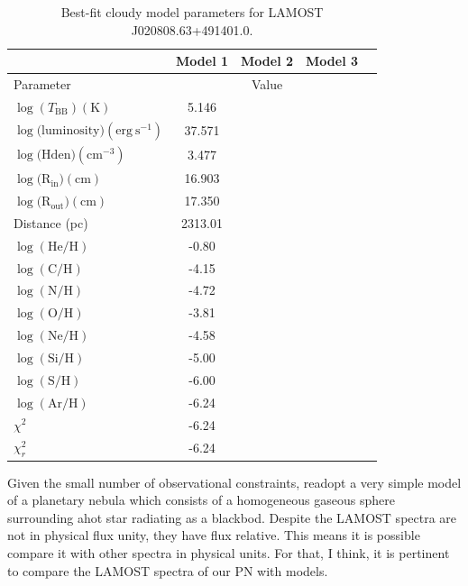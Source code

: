 \documentclass[fleqn,usenatbib]{mnras}
\begin{document}
{%
\begin{table}
	\centering
	\caption{Best-fit {\sc cloudy} model parameters for LAMOST J020808.63+491401.0.}
	\label{tab:example_table}
	\begin{tabular}{lcccc} %
                \hline
                & Model 1 &  Model 2 &  Model 3\\  
		\hline
		Parameter & & Value \\
                \hline
		$\log(T_{\mathrm{BB}}) (\mathrm{K})$  & 5.146 \\
		$\log(\mathrm{luminosity) (erg~s^{-1})}$ & 37.571 \\
		  $\log(\mathrm{Hden) (cm^{-3})} $ & 3.477 \\
                  $\log(\mathrm{R_{in}) (cm)}$ & 16.903 \\
                $\log(\mathrm{R_{out}) (cm)}$ & 17.350 \\
                 Distance (pc) & 2313.01 \\
                  $\log(\mathrm{He/H})$ & -0.80 \\
                $\log(\mathrm{C/H})$ & -4.15 \\
                $\log(\mathrm{N/H})$ & -4.72 \\
                $\log(\mathrm{O/H})$ & -3.81 \\
                $\log(\mathrm{Ne/H})$ & -4.58 \\
                $\log(\mathrm{Si/H})$ & -5.00 \\
                $\log(\mathrm{S/H})$ & -6.00 \\
                $\log(\mathrm{Ar/H})$ & -6.24 \\
                 \hline
                 $\chi^2$ & -6.24 \\
                 $\chi^2_r$ & -6.24 \\
                 
                \hline
	\end{tabular}
\end{table}

Given the small number of observational constraints, readopt a very simple model of a planetary nebula which
consists of a homogeneous gaseous sphere surrounding ahot star radiating as a blackbod.
Despite the LAMOST spectra are not in physical flux unity, they have flux relative. This means it
is possible compare it with other spectra in physical units. For that, I think, it is pertinent to
compare the LAMOST spectra of our PN with models.

}
\end{document}
